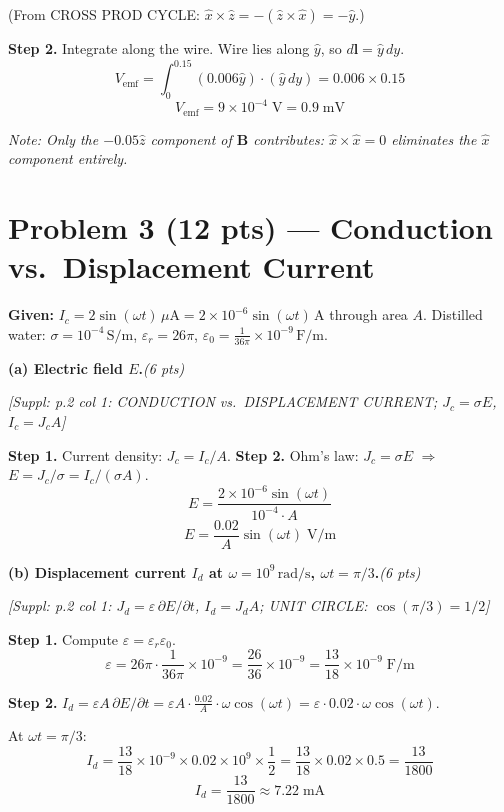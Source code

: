 \documentclass[11pt,letterpaper]{article}
\newcommand{\refbox}[1]{\textcolor{ref}{\textit{[Suppl: #1]}}}
\newcommand{\ptag}[1]{\hfill\textit{(#1 pts)}}
\newcommand{\step}[1]{\medskip\noindent\textbf{Step #1.}\enspace}
\newcommand{\note}[1]{\par\noindent\textcolor{note}{\textit{Note: #1}}}
\begin{document}
(From CROSS PROD CYCLE: $\hat{x}\times\hat{z}=-(\hat{z}\times\hat{x})=-\hat{y}$.)

\step{2} Integrate along the wire. Wire lies along $\hat{y}$, so $d\mathbf{l}=\hat{y}\,dy$.
\[
V_\text{emf} = \int_0^{0.15}(0.006\hat{y})\cdot(\hat{y}\,dy)
= 0.006\times 0.15
\]
\[
\boxed{V_\text{emf} = 9\times10^{-4}\;\text{V} = 0.9\;\text{mV}}
\]

\note{Only the $-0.05\hat{z}$ component of $\mathbf{B}$ contributes: $\hat{x}\times\hat{x}=0$
eliminates the $\hat{x}$ component entirely.}

\section*{Problem 3 (12 pts) --- Conduction vs.\ Displacement Current}

\textbf{Given:} $I_c=2\sin(\omega t)\,\mu\text{A}=2\times10^{-6}\sin(\omega t)\,\text{A}$ through area $A$.
Distilled water: $\sigma=10^{-4}\,\text{S/m}$, $\varepsilon_r=26\pi$,
$\varepsilon_0=\tfrac{1}{36\pi}\times10^{-9}\,\text{F/m}$.

\medskip

\textbf{(a) Electric field $E$.}\ptag{6}

\refbox{p.2 col 1: CONDUCTION vs.\ DISPLACEMENT CURRENT; $J_c=\sigma E$, $I_c=J_c A$}

\step{1} Current density: $J_c = I_c/A$.
\step{2} Ohm's law: $J_c=\sigma E$ $\Rightarrow$ $E=J_c/\sigma = I_c/(\sigma A)$.
\[
E = \frac{2\times10^{-6}\sin(\omega t)}{10^{-4}\cdot A}
\]
\[
\boxed{E = \frac{0.02}{A}\sin(\omega t)\;\text{V/m}}
\]

\medskip

\textbf{(b) Displacement current $I_d$ at $\omega=10^9\,\text{rad/s}$, $\omega t=\pi/3$.}\ptag{6}

\refbox{p.2 col 1: $J_d=\varepsilon\,\partial E/\partial t$, $I_d=J_d A$; UNIT CIRCLE: $\cos(\pi/3)=1/2$}

\step{1} Compute $\varepsilon=\varepsilon_r\varepsilon_0$.
\[
\varepsilon = 26\pi\cdot\frac{1}{36\pi}\times10^{-9} = \frac{26}{36}\times10^{-9}
= \frac{13}{18}\times10^{-9}\;\text{F/m}
\]

\step{2} $I_d = \varepsilon A\,\partial E/\partial t = \varepsilon A\cdot\frac{0.02}{A}\cdot\omega\cos(\omega t)
= \varepsilon\cdot 0.02\cdot\omega\cos(\omega t)$.

At $\omega t=\pi/3$:
\[
I_d = \frac{13}{18}\times10^{-9}\times 0.02\times10^9\times\frac{1}{2}
= \frac{13}{18}\times 0.02\times 0.5
= \frac{13}{1800}
\]
\[
\boxed{I_d = \frac{13}{1800}\approx 7.22\;\text{mA}}
\]
\end{document}
